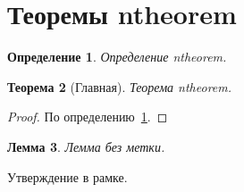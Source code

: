 \documentclass[12pt]{article}
\theoremstyle{plain}
\newtheorem{theorem}{Теорема}[section]
\newtheorem{lemma}[theorem]{Лемма}
\newtheorem{definition}[theorem]{Определение}
\theoremstyle{nonumberplain}
\newtheorem{proof}{Доказательство}
\begin{document}
\section{Теоремы ntheorem}

\begin{definition}\label{def:n}
Определение ntheorem.
\end{definition}

\begin{theorem}[Главная]\label{thm:n}
Теорема ntheorem.
\end{theorem}

\begin{proof}
По определению~\ref{def:n}.
\end{proof}

\begin{lemma}
Лемма без метки.
\end{lemma}

\begin{framedclaim}
Утверждение в рамке.
\end{framedclaim}
\end{document}
